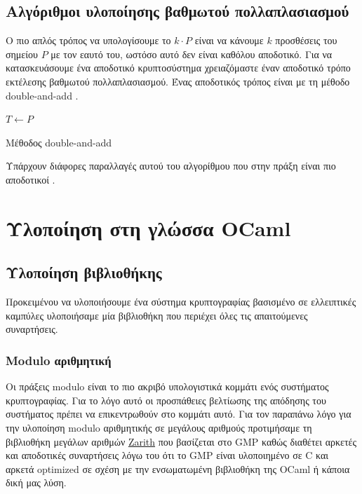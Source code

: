 \documentclass[12pt]{article}
\begin{document}
\subsection{Αλγόριθμοι υλοποίησης βαθμωτού πολλαπλασιασμού}
Ο πιο απλός τρόπος να υπολογίσουμε το $k \cdot P$ είναι να κάνουμε $k$ προσθέσεις του σημείου $P$ με τον εαυτό του, ωστόσο αυτό δεν είναι καθόλου αποδοτικό.
Για να κατασκευάσουμε ένα αποδοτικό κρυπτοσύστημα χρειαζόμαστε έναν αποδοτικό τρόπο εκτέλεσης βαθμωτού πολλαπλασιασμού.
Ένας αποδοτικός τρόπος είναι με τη μέθοδο double-and-add \cite{PAAR}. \\
\medskip

\begin{algorithm}[H]
\SetAlgoNoLine 
 $T \leftarrow P$ \\
\caption{Μέθοδος double-and-add}
\end{algorithm}

\bigskip
Υπάρχουν διάφορες παραλλαγές αυτού του αλγορίθμου που στην πράξη είναι πιο αποδοτικοί \cite{BERN}.
\pagebreak
\section{Υλοποίηση στη γλώσσα OCaml}
\subsection{Υλοποίηση βιβλιοθήκης}
Προκειμένου να υλοποιήσουμε ένα σύστημα κρυπτογραφίας βασισμένο σε ελλειπτικές καμπύλες  υλοποιήσαμε μία βιβλιοθήκη που περιέχει όλες τις απαιτούμενες συναρτήσεις.
\subsubsection{Modulo αριθμητική}
Οι πράξεις modulo είναι το πιο ακριβό υπολογιστικά κομμάτι ενός συστήματος κρυπτογραφίας. Για το λόγο αυτό οι προσπάθειες βελτίωσης της απόδησης του συστήματος πρέπει να επικεντρωθούν στο κομμάτι αυτό. 
Για τον παραπάνω λόγο για την υλοποίηση modulo αριθμητικής σε μεγάλους αριθμούς προτιμήσαμε τη βιβλιοθήκη μεγάλων αριθμών \href{http://forge.ocamlcore.org/projects/zarith}{Zarith} που βασίζεται στο GMP καθώς διαθέτει αρκετές και αποδοτικές συναρτήσεις λόγω του ότι το GMP είναι υλοποιημένο σε C και αρκετά optimized σε σχέση με την ενσωματωμένη βιβλιοθήκη της OCaml ή κάποια δική μας λύση.
\end{document}
